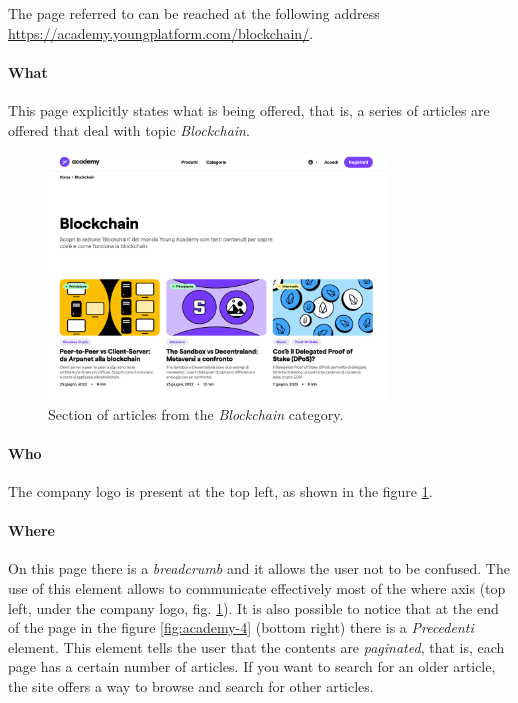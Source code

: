 The page referred to can be reached at the following address \\
\href{https://academy.youngplatform.com/blockchain/}{https://academy.youngplatform.com/blockchain/}. 

\paragraph{What}

This page explicitly states what is being offered, that is, a series of 
articles are offered that deal with topic \textit{Blockchain}. 

\begin{figure}[H]
  \centering
  \includegraphics[width=0.80\textwidth]{res/images/internal-pages/academy/academy-3.png}
  \caption{Section of articles from the \textit{Blockchain} category.}
  \label{fig:academy-3}
\end{figure}

\paragraph{Who}

The company logo is present at the top left, as shown in the figure 
\ref{fig:academy-3}.

\paragraph{Where}

On this page there is a \textit{breadcrumb} and it allows the user not to 
be confused. The use of this element allows to communicate effectively 
most of the where axis (top left, under the company logo, fig. 
\ref{fig:academy-3}). It is also possible to notice that at the end of the 
page in the figure \ref{fig:academy-4} (bottom right) there is a 
\textit{Precedenti} element. This element tells the user that the contents 
are \textit{paginated}, that is, each page has a certain number of 
articles. If you want to search for an older article, the site offers a 
way to browse and search for other articles.


